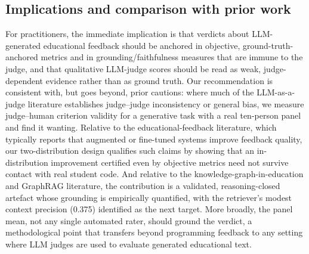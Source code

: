 \documentclass[sageh]{sagej}
\begin{document}
\subsection{Implications and comparison with prior work}
For practitioners, the immediate implication is that verdicts about LLM-generated educational feedback should be anchored in objective, ground-truth-anchored metrics and in grounding/faithfulness measures that are immune to the judge, and that qualitative LLM-judge scores should be read as weak, judge-dependent evidence rather than as ground truth. Our recommendation is consistent with, but goes beyond, prior cautions: where much of the LLM-as-a-judge literature establishes judge--judge inconsistency or general bias,\cite{li2024judges,verga2024poll,zheng2023judging} we measure judge--human criterion validity for a generative task with a real ten-person panel and find it wanting. Relative to the educational-feedback literature, which typically reports that augmented or fine-tuned systems improve feedback quality,\cite{sahu2025autograder,scholz2025partnering,yu2025codereview,phung2023feedback} our two-distribution design qualifies such claims by showing that an in-distribution improvement certified even by objective metrics need not survive contact with real student code. And relative to the knowledge-graph-in-education and GraphRAG literature,\cite{qu2024survey,cheng2025graphrag,peng2024graphrag,pan2024unifying} the contribution is a validated, reasoning-closed artefact whose grounding is empirically quantified, with the retriever's modest context precision (0.375) identified as the next target. More broadly, the panel mean, not any single automated rater, should ground the verdict, a methodological point that transfers beyond programming feedback to any setting where LLM judges are used to evaluate generated educational text.
\end{document}
